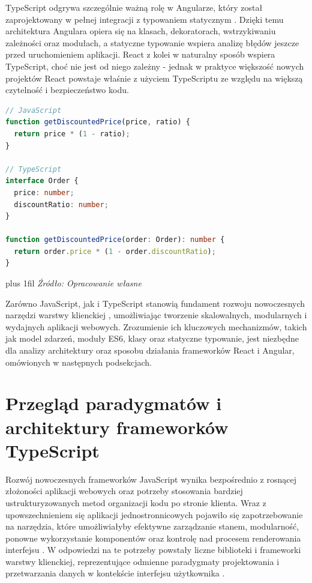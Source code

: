 \documentclass[12pt,openright,twoside]{report}
\newcommand{\source}[1]{{\par\vspace{5pt}\noindent\leftskip=0pt \rightskip=0pt \parfillskip=0pt plus 1fil \footnotesize\textit{Źródło: #1}\par}}
\begin{document}
TypeScript odgrywa szczególnie ważną rolę w Angularze, który został zaprojektowany w pełnej integracji z typowaniem statycznym \cite{Pro_TypeScript}. Dzięki temu architektura Angulara opiera się na klasach, dekoratorach, wstrzykiwaniu zależności oraz modułach, a statyczne typowanie wspiera analizę błędów jeszcze przed uruchomieniem aplikacji. React z kolei w naturalny sposób wspiera TypeScript, choć nie jest od niego zależny - jednak w praktyce większość nowych projektów React powstaje właśnie z użyciem TypeScriptu ze względu na większą czytelność i bezpieczeństwo kodu.

\begin{lstlisting}[language=TypeScript, caption={Porównanie fragmentu kodu w języku JavaScript oraz TypeScript.}, label={lst:js-vs-ts}]
// JavaScript
function getDiscountedPrice(price, ratio) {
  return price * (1 - ratio);
}

// TypeScript
interface Order {
  price: number;
  discountRatio: number;
}

function getDiscountedPrice(order: Order): number {
  return order.price * (1 - order.discountRatio);
}
\end{lstlisting}
\source{Opracowanie własne}

Zarówno JavaScript, jak i TypeScript stanowią fundament rozwoju nowoczesnych narzędzi warstwy klienckiej \cite{Practical_Modern_JS}, umożliwiając tworzenie skalowalnych, modularnych i wydajnych aplikacji webowych. Zrozumienie ich kluczowych mechanizmów, takich jak model zdarzeń, moduły ES6, klasy oraz statyczne typowanie, jest niezbędne dla analizy architektury oraz sposobu działania frameworków React i Angular, omówionych w następnych podsekcjach.

\section{Przegląd paradygmatów i architektury frameworków TypeScript}
Rozwój nowoczesnych frameworków JavaScript wynika bezpośrednio z rosnącej złożoności aplikacji webowych oraz potrzeby stosowania bardziej ustrukturyzowanych metod organizacji kodu po stronie klienta. Wraz z upowszechnieniem się aplikacji jednostronnicowych pojawiło się zapotrzebowanie na narzędzia, które umożliwiałyby efektywne zarządzanie stanem, modularność, ponowne wykorzystanie komponentów oraz kontrolę nad procesem renderowania interfejsu \cite{React_Up_Running}. W odpowiedzi na te potrzeby powstały liczne biblioteki i frameworki warstwy klienckiej, reprezentujące odmienne paradygmaty projektowania i przetwarzania danych w kontekście interfejsu użytkownika \cite{React_Up_Running}.
\end{document}
